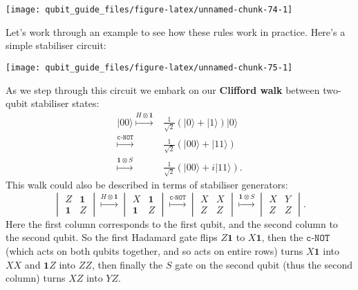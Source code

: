 \documentclass[fleqn]{article}
\begin{document}
\begin{center}\texttt{[image: qubit\_guide\_files/figure-latex/unnamed-chunk-74-1]} \end{center}

Let's work through an example to see how these rules work in practice.
Here's a simple stabiliser circuit:

\begin{center}\texttt{[image: qubit\_guide\_files/figure-latex/unnamed-chunk-75-1]} \end{center}

As we step through this circuit we embark on our \textbf{Clifford walk} between two-qubit stabiliser states:
\[
  \begin{aligned}
    |00\rangle
    \overset{H\otimes\mathbf{1}}{\longmapsto}
    &\frac{1}{\sqrt{2}}(|0\rangle+|1\rangle)|0\rangle
  \\\overset{\texttt{c-NOT}}{\longmapsto}
    &\frac{1}{\sqrt{2}}(|00\rangle+|11\rangle)
  \\\overset{\mathbf{1}\otimes S}{\longmapsto}
    &\frac{1}{\sqrt{2}}(|00\rangle+i|11\rangle).
  \end{aligned}
\]
This walk could also be described in terms of stabiliser generators:
\[
  \begin{vmatrix}
    Z&\mathbf{1}
  \\\mathbf{1}&Z
  \end{vmatrix}
  \overset{H\otimes\mathbf{1}}{\longmapsto}
  \begin{vmatrix}
    X&\mathbf{1}
  \\\mathbf{1}&Z
  \end{vmatrix}
  \overset{\texttt{c-NOT}}{\longmapsto}
  \begin{vmatrix}
    X&X
  \\Z&Z
  \end{vmatrix}
  \overset{\mathbf{1}\otimes S}{\longmapsto}
  \begin{vmatrix}
    X&Y
  \\Z&Z
  \end{vmatrix}.
\]
Here the first column corresponds to the first qubit, and the second column to the second qubit.
So the first Hadamard gate flips \(Z\mathbf{1}\) to \(X\mathbf{1}\), then the \(\texttt{c-NOT}\) (which acts on both qubits together, and so acts on entire rows) turns \(X\mathbf{1}\) into \(XX\) and \(\mathbf{1}Z\) into \(ZZ\), then finally the \(S\) gate on the second qubit (thus the second column) turns \(XZ\) into \(YZ\).
\end{document}
